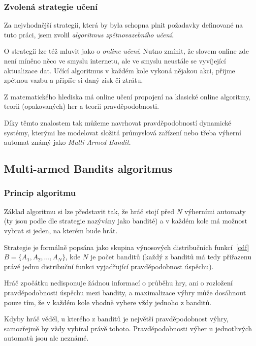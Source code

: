 \documentclass[thesis=M,czech]{FITthesis}[2014/05/07]
\begin{document}
\subsubsection{Zvolená strategie učení}
\label{sub:online}
Za nejvhodnější strategii, která by byla schopna plnit požadavky definované na tuto práci, jsem zvolil \emph{algoritmus zpětnovazebního učení}.

O strategii lze též mluvit jako o \emph{online učení}. Nutno zmínit, že slovem online zde není míněno něco ve smyslu internetu, ale ve smyslu neustále se vyvíjející aktualizace dat. Učící algoritmus v každém kole vykoná nějakou akci, přijme zpětnou vazbu a připíše si daný zisk či ztrátu.

Z matematického hlediska má online učení propojení na klasické online algoritmy, teorii (opakovaných) her a teorii pravděpodobnosti.

Díky těmto znalostem tak můžeme navrhovat pravděpodobností dynamické systémy, kterými lze modelovat složitá průmyslová zařízení nebo třeba výherní automat známý jako \emph{Multi-Armed Bandit}.

\subsection{Multi-armed Bandits algoritmus}
\label{sec:multi}

\subsubsection{Princip algoritmu}
Základ algoritmu si lze představit tak, že hráč stojí před $N$ výherními automaty (ty jsou podle dle strategie nazývány jako bandité) a v každém kole má možnost vybrat si jeden, na kterém bude hrát.

Strategie je formálně popsána jako skupina výnosových distribučních funkcí~\ref{cdf} $B = \{ A_1, A_2, \ldots, A_N \}$, kde $N$ je počet banditů (každý z banditů má tedy přiřazenu právě jednu distribuční funkci vyjadřující pravděpodobnost úspěchu). 

Hráč zpočátku nedisponuje žádnou informací o průběhu hry, ani o rozložení pravděpodobnosti úspěchu mezi bandity, a maximalizace výhry může dosáhnout pouze tím, že v každém kole vhodně vybere vždy jednoho z banditů.

Kdyby hráč věděl, u kterého z banditů je největší pravděpodobnost výhry, samozřejmě by vždy vybíral právě tohoto. Pravděpodobnosti výher u jednotlivých automatů jsou ale neznámé.
\end{document}

